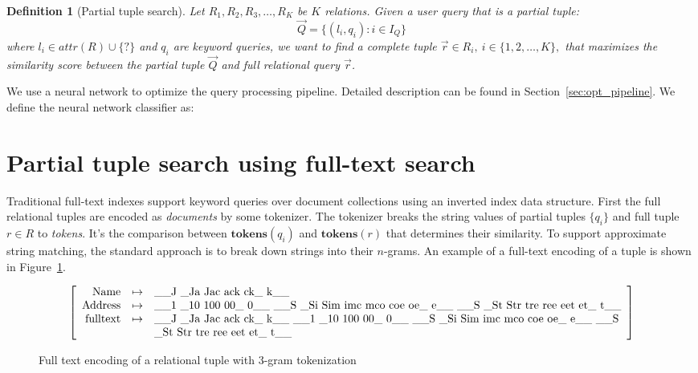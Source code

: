 \documentclass[conference]{IEEEtran}
\newtheorem{definition}{Definition}
\begin{document}
\begin{definition}[Partial tuple search]
Let $R_1, R_2, R_3, \dots, R_K$ be $K$ relations. 
Given a user query that is a partial tuple: $$\vec Q = \{(l_i, q_i): i\in I_Q\}$$ 
where $l_i \in attr(R)\cup\{?\}$ and $q_i$ are keyword queries, 
we want to find a complete tuple $\vec r \in R_i,\ i\in\{1, 2, \dots, K\},$ that maximizes the similarity score
between the partial tuple $\Vec Q$ and full relational query $\vec r$.
\end{definition}

We use a neural network to optimize the query processing pipeline. Detailed
description can be found in  Section~\ref{sec:opt_pipeline}. We define the
neural network classifier as:


\section{Partial tuple search using full-text search}
\label{sec:search_fulltext_index}
Traditional full-text indexes support keyword queries
over document collections using an inverted index data structure.  First the full relational
tuples are encoded as {\em documents} by some tokenizer.  The tokenizer breaks the string values of partial tuples
$\{q_i\}$ and full tuple $r\in R$ to {\em tokens}.  It's the comparison between $\mathbf{tokens}(q_i)$ and $\mathbf{tokens}(r)$
that determines their similarity.  To support approximate string matching, the standard approach \cite{kim2007n,kondrak2005n}
is to break down strings into their $n$-grams.  An example of a full-text encoding of a tuple is shown in Figure~\ref{fig:encoding}.

\begin{figure}[t]
	\label{fig:encoding}
$$
\left[\begin{array}{rcl}
\mathrm{Name} & \mapsto & \makebox{\_\_J \_Ja Jac ack ck\_ k\_\_} \\
\mathrm{Address} & \mapsto & \makebox{\_\_1 \_10 100 00\_ 0\_\_ \_\_S \_Si Sim imc mco coe oe\_ e\_\_ \_\_S \_St Str tre ree eet et\_ t\_\_} \\
\mathrm{fulltext} & \mapsto & \makebox{\_\_J \_Ja Jac ack ck\_ k\_\_ \_\_1 \_10 100 00\_ 0\_\_ \_\_S \_Si Sim imc mco coe oe\_ e\_\_ \_\_S} \\ 
 & & \makebox{\_St Str tre ree eet et\_ t\_\_}\\
\end{array}\right]
$$
	\caption{Full text encoding of a relational tuple with 3-gram tokenization}
\end{figure}
\end{document}
